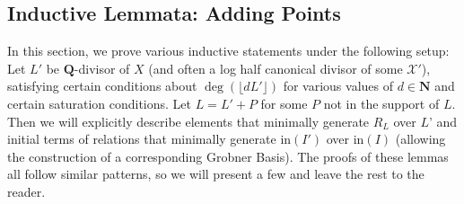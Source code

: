 \documentclass{amsart}
\theoremstyle{plain}
\theoremstyle{definition}
\theoremstyle{remark}
\numberwithin{equation}{section}
\newcommand\ssec{\subsection}
\newcommand \sx{\mathscr X}
\newcommand \halfcan{L}
\newcommand \initial{\text{in}}
\begin{document}
\ssec{Inductive Lemmata: Adding Points}
\label{ssec:add_pts}
In this section, we prove various inductive statements under the following setup:
Let $\halfcan'$ be $\mathbf{Q}$-divisor of $X$ (and often a log half canonical divisor of some $\sx'$), satisfying certain conditions about $\deg(\lfloor d \halfcan'\rfloor)$ for various values of $d\in\mathbf{N}$ and certain saturation conditions.  Let $\halfcan=\halfcan'+P$ for some $P$ not in the support of $\halfcan$.  Then we will explicitly describe elements that minimally generate $R_\halfcan$ over $\halfcan$' and initial terms of relations that minimally generate $\initial(I')$ over $\initial(I)$ (allowing the construction of a corresponding Grobner Basis).   The proofs of these lemmas all follow similar patterns, so we will present a few  and leave the rest to the reader.

\end{document}

